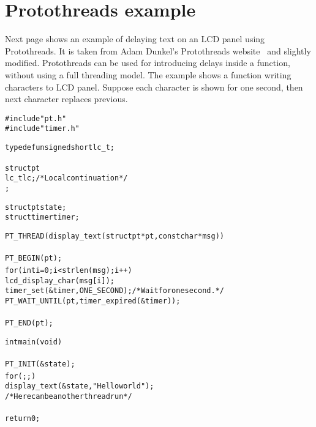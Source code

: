 

\chapter{Protothreads example}\label{app:protothreads}
Next page shows
an example of delaying text on an LCD panel using Protothreads.
It is taken from
Adam Dunkel's Protothreads website~\cite{adam-protothreads} and slightly modified.
Protothreads can be used for introducing delays inside a function, without using a full threading model.
The example shows a function writing characters to LCD panel.
Suppose each character is shown for one second, then next character replaces previous.

\newpage

\begin{alltt}
%\begin{lstlisting}
#include "pt.h"
#include "timer.h"

typedef unsigned short lc_t;

struct pt {
  lc_t lc;         /* Local continuation */
}; 

struct pt state;
struct timer timer;
 
PT_THREAD(display_text(struct pt *pt, const char *msg))
{
  PT_BEGIN(pt);
  for (int i = 0; i < strlen(msg); i++) {
    lcd_display_char(msg[i]);
    timer_set(&timer, ONE_SECOND);  /* Wait for one second. */
    PT_WAIT_UNTIL(pt, timer_expired(&timer));
  }
  PT_END(pt);
}

int main(void)
{
  PT_INIT(&state);
  for (;;) {
    display_text(&state, "Hello world");
    /* Here can be another thread run */
  }
  return 0;
}

%\end{lstlisting}
\end{alltt}

